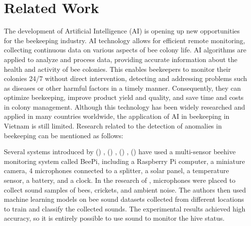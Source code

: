 \documentclass[twocolumn]{article}
\begin{document}
\section{Related Work}
The development of Artificial Intelligence (AI) is opening up new opportunities for the
beekeeping industry. AI technology allows for efficient remote monitoring, collecting
continuous data on various aspects of bee colony life. AI algorithms are applied to analyze
and process data, providing accurate information about the health and activity of bee
colonies. This enables beekeepers to monitor their colonies 24/7 without direct
intervention, detecting and addressing problems such as diseases or other harmful
factors in a timely manner. Consequently, they can optimize beekeeping, improve product
yield and quality, and save time and costs in colony management. Although this technology
has been widely researched and applied in many countries worldwide, the application of AI
in beekeeping in Vietnam is still limited. Research related to the detection of anomalies
in beekeeping can be mentioned as follows:

Several systems introduced by
\citeauthor{schurischuster2016sensor} (\citeyear{schurischuster2016sensor}) \cite{schurischuster2016sensor},
\citeauthor{zacepins2016remote} (\citeyear{zacepins2016remote}) \cite{zacepins2016remote},
\citeauthor{antonio2017frequency} (\citeyear{antonio2017frequency}) \cite{antonio2017frequency},
\citeauthor{crawford2017automated} (\citeyear{crawford2017automated}) \cite{crawford2017automated}
have used a multi-sensor beehive monitoring system
called BeePi, including a Raspberry Pi computer, a miniature camera, 4 microphones connected
to a splitter, a solar panel, a temperature sensor, a battery, and a clock. In the research
of \citeauthor{kulyukin2018toward} \cite{kulyukin2018toward}, microphones were placed to collect sound samples of bees,
crickets, and ambient noise. The authors then used machine learning models on bee sound
datasets collected from different locations to train and classify the collected sounds.
The experimental results achieved high accuracy, so it is entirely possible to use sound
to monitor the hive status.
\end{document}
